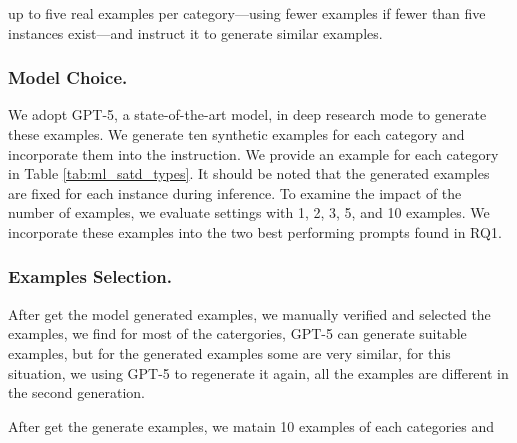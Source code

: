 \documentclass[acmsmall,screen,review,anonymous]{acmart}
\begin{document}
up to five real examples per category—using fewer examples if fewer than five instances exist—and instruct it to generate similar examples. 


\subsubsection{Model Choice.} We adopt GPT-5, a state-of-the-art model, in deep research mode to generate these examples. We generate ten synthetic examples for each category and incorporate them into the instruction. We provide an example for each category in Table \ref{tab:ml_satd_types}. It should be noted that the generated examples are fixed for each instance during inference. To examine the impact of the number of examples, we evaluate settings with 1, 2, 3, 5, and 10 examples. We incorporate these examples into the two best performing prompts found in RQ1.


\subsubsection{Examples Selection.} After get the model generated examples, we manually verified and selected the examples, we find for most of the catergories, GPT-5 can generate suitable examples, but for the generated examples some are very similar, for this situation, we using GPT-5 to regenerate it again, all the examples are different in the second generation.

After get the generate examples, we matain 10 examples of each categories and 










  
\end{document}
